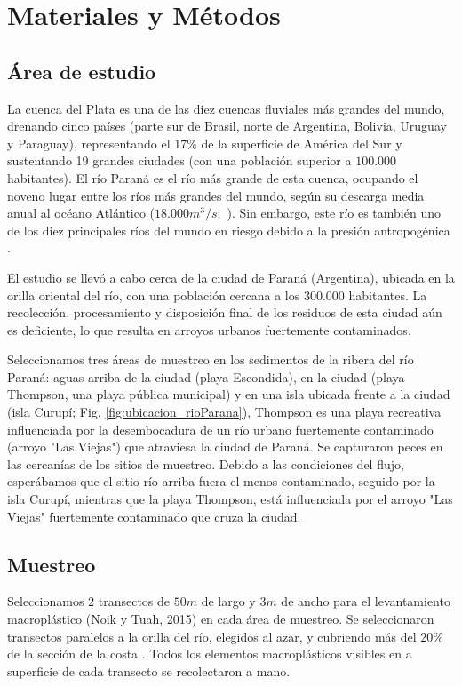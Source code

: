\section{Materiales y Métodos}%
\label{sec:materiales_metodos}

\subsection{Área de estudio}
La cuenca del Plata es una de las diez cuencas fluviales más grandes del mundo, drenando cinco países (parte sur de Brasil, norte de Argentina, Bolivia, Uruguay y Paraguay), representando el $17\%$ de la superficie de América del Sur y sustentando 19 grandes ciudades (con una población superior a $100.000$ habitantes). El río Paraná es el río más grande de esta cuenca, ocupando el noveno lugar entre los ríos más grandes del mundo, según su descarga media anual al océano Atlántico ($18.000 m^{3}/s$;~\cite{LATRUBESSE2008130}). Sin embargo, este río es también uno de los diez principales ríos del mundo en riesgo debido a la presión antropogénica \parencite{wong2007world}.

El estudio se llevó a cabo cerca de la ciudad de Paraná (Argentina), ubicada en la orilla oriental del río, con una población cercana a los $300.000$ habitantes. La recolección, procesamiento y disposición final de los residuos de esta ciudad aún es deficiente, lo que resulta en arroyos urbanos fuertemente contaminados.

Seleccionamos tres áreas de muestreo en los sedimentos de la ribera del río Paraná: aguas arriba de la ciudad (playa Escondida), en la ciudad (playa Thompson, una playa pública municipal) y en una isla ubicada frente a la ciudad (isla Curupí; Fig. \ref{fig:ubicacion_rioParana}), Thompson es una playa recreativa influenciada por la desembocadura de un río urbano fuertemente contaminado (arroyo "Las Viejas") que atraviesa la ciudad de Paraná. Se capturaron peces en las cercanías de los sitios de muestreo. Debido a las condiciones del flujo, esperábamos que el sitio río arriba fuera el menos contaminado, seguido por la isla Curupí, mientras que la playa Thompson, está influenciada por el arroyo "Las Viejas" fuertemente contaminado que cruza la ciudad.

\subsection{Muestreo}
Seleccionamos 2 transectos de $50m$ de largo y $3m$ de ancho para el levantamiento macroplástico (Noik y Tuah, 2015) en cada área de muestreo. Se seleccionaron transectos paralelos a la orilla del río, elegidos al azar, y cubriendo más del $20\%$ de la sección de la costa \parencite{lippiatt2013marine}. Todos los elementos macroplásticos visibles en a superficie de cada transecto se recolectaron a mano.

